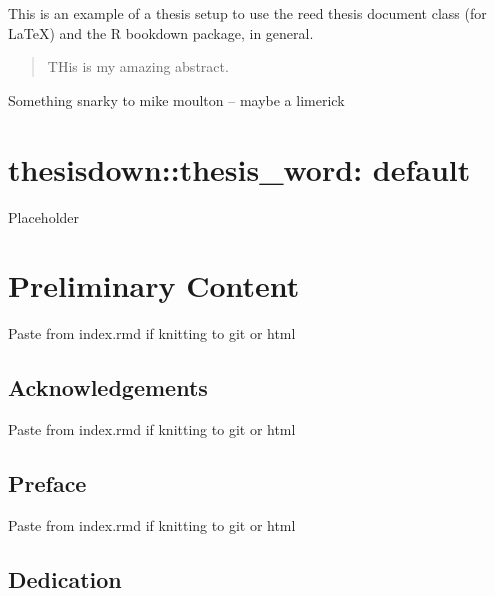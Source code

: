\documentclass[12pt,twoside]{reedthesis}
\begin{document}
  \begin{preface}
    This is an example of a thesis setup to use the reed thesis document
    class (for LaTeX) and the R bookdown package, in general.
  \end{preface}
  \hypersetup{linkcolor=black}
  \setcounter{tocdepth}{2}
  \tableofcontents

  \listoftables

  \listoffigures
  \begin{abstract}
    THis is my amazing abstract.
  \end{abstract}
  \begin{dedication}
    Something snarky to mike moulton -- maybe a limerick
  \end{dedication}
\mainmatter %
\pagestyle{fancyplain} %

\chapter{thesisdown::thesis\_word:
default}\label{thesisdownthesis_word-default}

Placeholder

\chapter*{Preliminary Content}\label{preliminary-content}

Paste from index.rmd if knitting to git or html

\section*{Acknowledgements}\label{acknowledgements}

Paste from index.rmd if knitting to git or html

\section*{Preface}\label{preface}

Paste from index.rmd if knitting to git or html

\section*{Dedication}\label{dedication}
\end{document}
